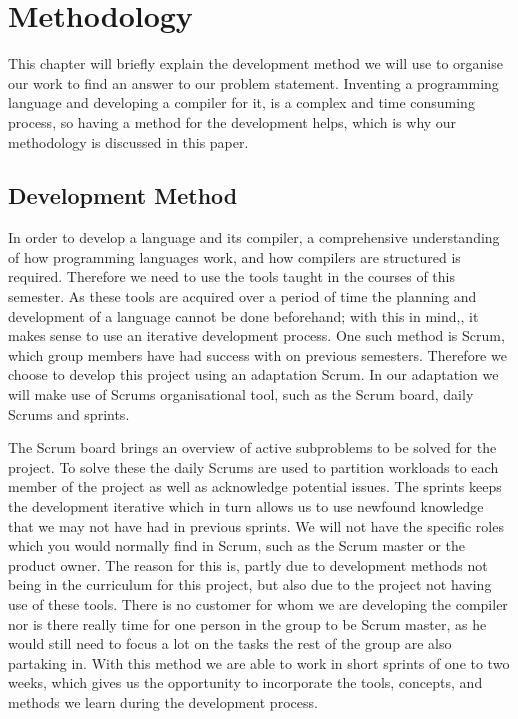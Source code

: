 \chapter{Methodology}\label{chap:methdology}

This chapter will briefly explain the development method we will use to organise our work to find an answer to our problem statement. 
Inventing a programming language and developing a compiler for it, is a complex and time consuming process, so having a method for the development helps, which is why our methodology is discussed in this paper.

\section{Development Method}
In order to develop a language and its compiler, a comprehensive understanding of how programming languages work, and how compilers are structured is required.
Therefore we need to use the tools taught in the courses of this semester.
As these tools are acquired over a period of time the planning and development of a language cannot be done beforehand; with this in mind,, it makes sense to use an iterative development process.
One such method is Scrum, which group members have had success with on previous semesters.
Therefore we choose to develop this project using an adaptation Scrum.
In our adaptation we will make use of Scrums organisational tool, such as the Scrum board, daily Scrums and sprints.

The Scrum board brings an overview of active subproblems to be solved for the project.
To solve these the daily Scrums are used to partition workloads to each member of the project as well as acknowledge potential issues.
The sprints keeps the development iterative which in turn allows us to use newfound knowledge that we may not have had in previous sprints.
We will not have the specific roles which you would normally find in Scrum, such as the Scrum master or the product owner. \citep{Scrum}
The reason for this is, partly due to development methods not being in the curriculum for this project, but also due to the project not having use of these tools.
There is no customer for whom we are developing the compiler nor is there really time for one person in the group to be Scrum master, as he would still need to focus a lot on the tasks the rest of the group are also partaking in.
With this method we are able to work in short sprints of one to two weeks, which gives us the opportunity to incorporate the tools, concepts, and methods we learn during the development process.


